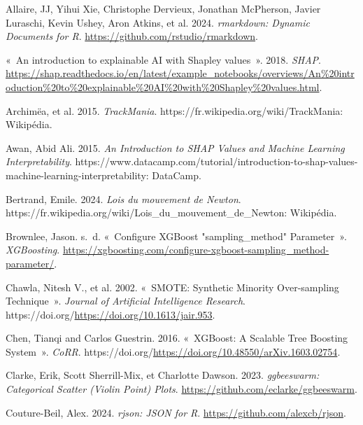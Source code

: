 \documentclass[
  oneside,
  open=any]{scrreprt}
\newlength{\cslhangindent}
\newenvironment{CSLReferences}[2] %
 {\begin{list}{}{%
  \setlength{\itemindent}{0pt}
  \setlength{\leftmargin}{0pt}
  \setlength{\parsep}{0pt}
  \ifodd #1
   \setlength{\leftmargin}{\cslhangindent}
   \setlength{\itemindent}{-1\cslhangindent}
  \fi
  \setlength{\itemsep}{#2\baselineskip}}}
 {\end{list}}
\begin{document}
\label{refs}
\begin{CSLReferences}{1}{0}

Allaire, JJ, Yihui Xie, Christophe Dervieux, Jonathan McPherson, Javier
Luraschi, Kevin Ushey, Aron Atkins, et al. 2024. \emph{rmarkdown:
Dynamic Documents for R}. \url{https://github.com/rstudio/rmarkdown}.

{«~An introduction to explainable AI with Shapley values~»}. 2018.
\emph{SHAP}.
\url{https://shap.readthedocs.io/en/latest/example_notebooks/overviews/An\%20introduction\%20to\%20explainable\%20AI\%20with\%20Shapley\%20values.html}.

Archimëa, et al. 2015. \emph{TrackMania}.
https://fr.wikipedia.org/wiki/TrackMania: Wikipédia.

Awan, Abid Ali. 2015. \emph{An Introduction to SHAP Values and Machine
Learning Interpretability}.
https://www.datacamp.com/tutorial/introduction-to-shap-values-machine-learning-interpretability:
DataCamp.

Bertrand, Emile. 2024. \emph{Lois du mouvement de Newton}.
https://fr.wikipedia.org/wiki/Lois\_du\_mouvement\_de\_Newton:
Wikipédia.

Brownlee, Jason. s.~d. {«~Configure XGBoost "sampling\_method"
Parameter~»}. \emph{XGBoosting}.
\url{https://xgboosting.com/configure-xgboost-sampling_method-parameter/}.

Chawla, Nitesh V., et al. 2002. {«~SMOTE: Synthetic Minority
Over-sampling Technique~»}. \emph{Journal of Artificial Intelligence
Research}. https://doi.org/\url{https://doi.org/10.1613/jair.953}.

Chen, Tianqi and Carlos Guestrin. 2016. {«~XGBoost: {A} Scalable Tree
Boosting System~»}. \emph{CoRR}.
https://doi.org/\url{https://doi.org/10.48550/arXiv.1603.02754}.

Clarke, Erik, Scott Sherrill-Mix, et Charlotte Dawson. 2023.
\emph{ggbeeswarm: Categorical Scatter (Violin Point) Plots}.
\url{https://github.com/eclarke/ggbeeswarm}.

Couture-Beil, Alex. 2024. \emph{rjson: JSON for R}.
\url{https://github.com/alexcb/rjson}.


\end{CSLReferences}
\end{document}
